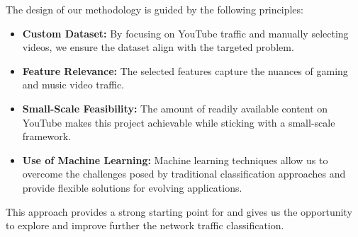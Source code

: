 \vspace{2mm}

The design of our methodology is guided by the following principles:
\begin{itemize}
    \item \textbf{Custom Dataset:} By focusing on YouTube traffic and manually selecting videos, we ensure the dataset align with the targeted problem.
    \item \textbf{Feature Relevance:} The selected features capture the nuances of gaming and music video traffic.
    \item \textbf{Small-Scale Feasibility:} The amount of readily available content on YouTube  makes this project achievable while sticking with a small-scale framework.
    \item \textbf{Use of Machine Learning:} Machine learning techniques allow us to overcome the challenges posed by traditional classification approaches and provide flexible solutions for evolving applications.
\end{itemize}

This approach provides a strong starting point for and gives us the opportunity to explore and improve further the network traffic classification.


